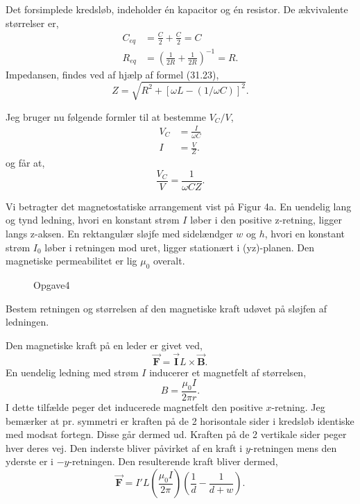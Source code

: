 \begin{solution}
Det forsimplede kredsløb, indeholder én kapacitor og én resistor. De ækvivalente størrelser er,
\begin{align*}
	C_{eq} &= \frac{C}{2} + \frac{C}{2} = C \\
	R_{eq} &= \left( \frac{1}{2R} + \frac{1}{2R} \right) ^{-1} = R 
.\end{align*}
Impedansen, findes ved af hjælp af formel (31.23),
\[
Z = \sqrt{R^2+\left[ \omega L - \left( 1 / \omega C \right)  \right]^2 }  
.\] 
\end{solution}
Jeg bruger nu følgende formler til at bestemme $V_C / V$,
\begin{align*}
V_C &=  \frac{I}{\omega C} \\
I &= \frac{V}{Z}
.\end{align*}
og får at,
\[
\frac{V_C}{V} = \frac{1}{\omega C Z}
.\] 
\begin{exercise}[Opgave 4]
Vi betragter det magnetostatiske arrangement vist på Figur 4a. En uendelig
lang og tynd ledning, hvori en konstant strøm $I$ løber i den positive z-retning,
ligger langs z-aksen. En rektangulær sløjfe med sidelændger $w$ og $h$, hvori en
konstant strøm $I_0$ løber i retningen mod uret, ligger stationært i (yz)-planen.
Den magnetiske permeabilitet er lig $\mu_0$ overalt.
\end{exercise}
\begin{figure}[ht]
    \centering
    \caption{Opgave4}
    \label{fig:opgave4}
\end{figure}
\begin{subexercise}[a]
Bestem retningen og størrelsen af den magnetiske kraft udøvet på sløjfen
af ledningen.
\end{subexercise}
\begin{solution}
Den magnetiske kraft på en leder er givet ved,
\[
\vec{\mathbf{F}} = \vec{\mathbf{I}} L \times \vec{\mathbf{B}} 
.\]
En uendelig ledning med strøm $I$ inducerer et magnetfelt af størrelsen,
 \[
B = \frac{\mu_0 I}{2\pi r}
.\]
I dette tilfælde peger det inducerede magnetfelt den positive $x$-retning. Jeg bemærker at pr. symmetri er kraften på de 2 horisontale sider i kredsløb identiske med modsat fortegn. Disse går dermed ud. Kraften på de 2 vertikale sider peger hver deres vej. Den inderste bliver påvirket af en kraft i $y$-retningen mens den yderste er i $-y$-retningen. Den resulterende kraft bliver dermed,
 \[
	 \vec{\mathbf{F}} = I'L\left( \frac{\mu_0 I}{2\pi} \right) \left( \frac{1}{d}-\frac{1}{d+w} \right) 
.\] 
\end{solution}
